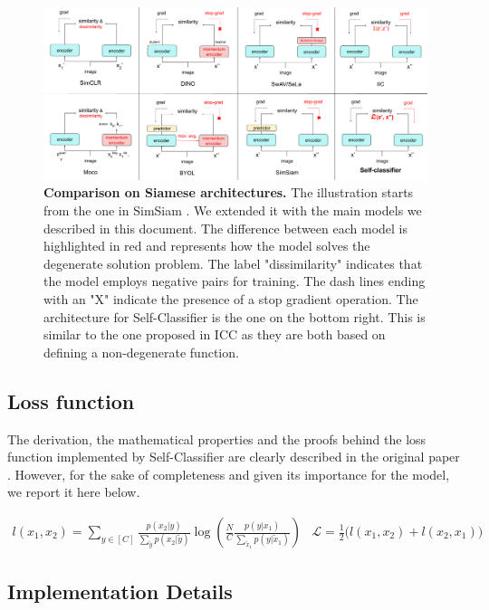\documentclass{article}
\begin{document}
\begin{figure}
    \centering
     \includegraphics[width=\textwidth]{images/siamese_network_comparison.png}
     \caption{\textbf{Comparison on Siamese architectures.} The illustration starts from the one in SimSiam \cite{simsiam}. We extended it with the main models we described in this document. The difference between each model is highlighted in red and represents how the model solves the degenerate solution problem. The label "dissimilarity" indicates that the model employs negative pairs for training. The dash lines ending with an "X" indicate the presence of a stop gradient operation. The architecture for Self-Classifier is the one on the bottom right. This is similar to the one proposed in ICC \cite{iic} as they are both based on defining a non-degenerate function.}
    \label{fig:1}
\end{figure}

\subsection{Loss function}
The derivation, the mathematical properties and the proofs behind the loss function implemented by Self-Classifier are clearly described in the original paper \cite{self_classifier}. However, for the sake of completeness and given its importance for the model, we report it here below.

\[ 
\begin{array}{cc} 
    l(x_1, x_2) = \sum_{y \in [C]} \frac{p(x_2 | y)}{\sum_{\tilde{y}} p(x_2 | \tilde{y})} \log \left( \frac{N}{C} \frac{p(y | x_1)}{\sum_{\tilde{x}_1} p(y | \tilde{x}_1)} \right)
    &
    \mathcal{L} = \frac{1}{2} \Big( l(x_1, x_2) + l(x_2, x_1) \Big)
\end{array}
 \]


\subsection{Implementation Details}
\label{subsec:implementation_details}
\end{document}
